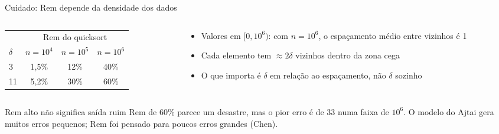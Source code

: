 \documentclass[aspectratio=169,10pt]{beamer}
\begin{document}
\begin{frame}{Cuidado: Rem depende da densidade dos dados}
  \begin{columns}[c]
    \begin{column}{0.5\textwidth}
      \begin{center}
        \small
        \begin{tabular}{lccc}
          \toprule
          & \multicolumn{3}{c}{Rem do quicksort} \\
          \cmidrule(lr){2-4}
          $\delta$ & $n=10^4$ & $n=10^5$ & $n=10^6$ \\
          \midrule
          3  & 1{,}5\% & 12\% & 40\% \\
          11 & 5{,}2\% & 30\% & 60\% \\
          \bottomrule
        \end{tabular}
      \end{center}
    \end{column}
    \begin{column}{0.48\textwidth}
      \begin{itemize}
        \item Valores em $[0, 10^6)$: com $n = 10^6$, o espaçamento médio entre vizinhos é 1
        \item Cada elemento tem $\approx 2\delta$ vizinhos dentro da zona cega
        \item O que importa é \alert{$\delta$ em relação ao espaçamento}, não $\delta$ sozinho
      \end{itemize}
    \end{column}
  \end{columns}
  \vspace{0.8em}
  \begin{alertblock}{Rem alto não significa saída ruim}
    Rem de 60\% parece um desastre, mas o pior erro é de 33 numa faixa de $10^6$.
    O modelo do Ajtai gera muitos erros pequenos; Rem foi pensado para poucos erros grandes (Chen).
  \end{alertblock}
\end{frame}
\end{document}
